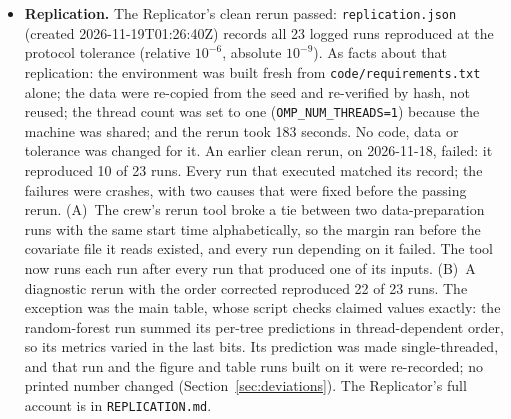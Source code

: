 \begin{itemize}
        from the full text and 14 from the abstract or opening text only. Where only the
        abstract or opening text could be read (as for \citet{imbens2003} and
        \citet{hirano2003}), the paper cites the source for no more than that text says.
        The full workspace is public at
        \url{https://github.com/brycewang-stanford/Free-Research-Crew/tree/main/gallery/ss-null-effect}.
        It contains the plan, the run ledger, the code, the data manifest, every review,
        the archived briefs, the PI's reconstruction of the earlier ones, the replication
        record and this paper's sources.
  \item \textbf{Replication.} The Replicator's clean rerun passed: \texttt{replication.json}
        (created 2026-11-19T01:26:40Z) records all 23 logged runs reproduced at the
        protocol tolerance (relative $10^{-6}$, absolute $10^{-9}$). As facts about that
        replication: the environment was built fresh from \texttt{code/requirements.txt}
        alone; the data were re-copied from the seed and re-verified by hash, not reused;
        the thread count was set to one (\texttt{OMP\_NUM\_THREADS=1}) because the machine
        was shared; and the rerun took 183 seconds. No code, data or tolerance was changed
        for it. An earlier clean rerun, on 2026-11-18, failed: it reproduced 10 of 23 runs.
        Every run that executed matched its record; the failures were crashes, with two
        causes that were fixed before the passing rerun. (A)~The crew's rerun tool broke a
        tie between two data-preparation runs with the same start time alphabetically, so
        the margin ran before the covariate file it reads existed, and every run depending
        on it failed. The tool now runs each run after every run that produced one of its
        inputs. (B)~A diagnostic rerun with the order corrected reproduced 22 of 23 runs.
        The exception was the main table, whose script checks claimed values exactly: the
        random-forest run summed its per-tree predictions in thread-dependent order, so its
        metrics varied in the last bits. Its prediction was made single-threaded, and that
        run and the figure and table runs built on it were re-recorded; no printed number
        changed (Section~\ref{sec:deviations}). The Replicator's full account is in
        \texttt{REPLICATION.md}.
\end{itemize}
